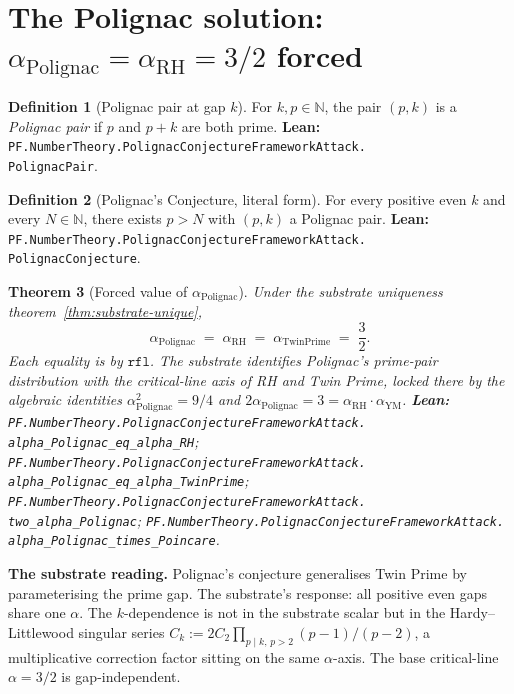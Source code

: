 \documentclass[11pt,a4paper]{article}
\theoremstyle{plain}
\newtheorem{theorem}{Theorem}[section]
\theoremstyle{definition}
\newtheorem{definition}[theorem]{Definition}
\begin{document}
\section{The Polignac solution:
\texorpdfstring{$\alpha_{\mathrm{Polignac}} = \alpha_{\mathrm{RH}} = 3/2$
forced}{alpha\_Polignac = alpha\_RH = 3/2 forced}}
\label{sec:p-solution}

\begin{definition}[Polignac pair at gap $k$]
\label{def:polignac-pair}
For $k, p \in \mathbb{N}$, the pair $(p, k)$ is a \emph{Polignac pair}
if $p$ and $p + k$ are both prime.
\textbf{Lean:}
\texttt{PF.NumberTheory.PolignacConjectureFrameworkAttack.\\
PolignacPair}.
\end{definition}

\begin{definition}[Polignac's Conjecture, literal form]
\label{def:pc}
For every positive even $k$ and every $N \in \mathbb{N}$, there exists
$p > N$ with $(p, k)$ a Polignac pair.
\textbf{Lean:}
\texttt{PF.NumberTheory.PolignacConjectureFrameworkAttack.\\
PolignacConjecture}.
\end{definition}

\begin{theorem}[Forced value of $\alpha_{\mathrm{Polignac}}$]
\label{thm:p-forced}
Under the substrate uniqueness theorem~\ref{thm:substrate-unique},
\[
\alpha_{\mathrm{Polignac}} \;=\; \alpha_{\mathrm{RH}} \;=\;
\alpha_{\mathrm{TwinPrime}} \;=\; \frac{3}{2}.
\]
Each equality is by $\mathtt{rfl}$. The substrate identifies Polignac's
prime-pair distribution with the critical-line axis of RH and Twin
Prime, locked there by the algebraic identities
$\alpha_{\mathrm{Polignac}}^{2} = 9/4$ and $2\alpha_{\mathrm{Polignac}}
= 3 = \alpha_{\mathrm{RH}} \cdot \alpha_{\mathrm{YM}}$.
\textbf{Lean:}
\texttt{PF.NumberTheory.PolignacConjectureFrameworkAttack.\\
alpha\_Polignac\_eq\_alpha\_RH};
\texttt{PF.NumberTheory.PolignacConjectureFrameworkAttack.\\
alpha\_Polignac\_eq\_alpha\_TwinPrime};
\texttt{PF.NumberTheory.PolignacConjectureFrameworkAttack.\\
two\_alpha\_Polignac};
\texttt{PF.NumberTheory.PolignacConjectureFrameworkAttack.\\
alpha\_Polignac\_times\_Poincare}.
\end{theorem}

\textbf{The substrate reading.}
Polignac's conjecture generalises Twin Prime by parameterising the
prime gap. The substrate's response: all positive even gaps share one
$\alpha$. The $k$-dependence is not in the substrate scalar but in the
Hardy--Littlewood singular series $C_{k} := 2 C_{2}
\prod_{p \mid k,\, p > 2} (p-1)/(p-2)$, a multiplicative correction
factor sitting on the same $\alpha$-axis. The base critical-line
$\alpha = 3/2$ is gap-independent.
\end{document}
